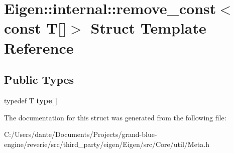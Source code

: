 \hypertarget{struct_eigen_1_1internal_1_1remove__const_3_01const_01_t[]_4}{}\section{Eigen\+::internal\+::remove\+\_\+const$<$ const T\mbox{[}\mbox{]}$>$ Struct Template Reference}
\label{struct_eigen_1_1internal_1_1remove__const_3_01const_01_t[]_4}
\subsection*{Public Types}
\begin{DoxyCompactItemize}
\item 
\mbox{\label{struct_eigen_1_1internal_1_1remove__const_3_01const_01_t[]_4_a61cf8ec377f9c0ec5bb13fd276996a73}} 
typedef T {\bfseries type}\mbox{[}$\,$\mbox{]}
\end{DoxyCompactItemize}


The documentation for this struct was generated from the following file\+:\begin{DoxyCompactItemize}
\item 
C\+:/\+Users/dante/\+Documents/\+Projects/grand-\/blue-\/engine/reverie/src/third\+\_\+party/eigen/\+Eigen/src/\+Core/util/Meta.\+h\end{DoxyCompactItemize}
